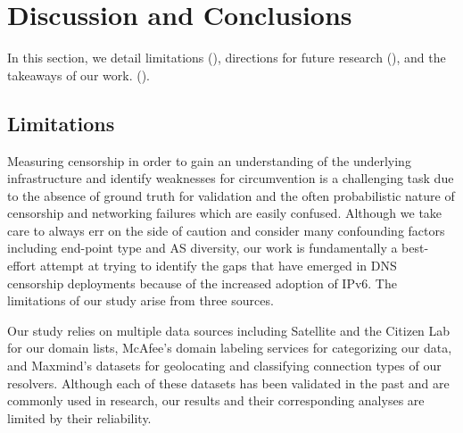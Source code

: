 \section{Discussion and Conclusions} \label{sec:discussion}

In this section, we detail limitations
(), directions for future research
(), and the takeaways of our work.
().

%

\subsection{Limitations}
\label{sec:discussion:limitations}
Measuring censorship in order to gain an understanding of the underlying
infrastructure and identify weaknesses for circumvention is a challenging task
due to the absence of ground truth for validation and the often probabilistic
nature of censorship and networking failures which are easily confused.
%
Although we take care to always err on the side of caution and consider many
confounding factors including end-point type and AS diversity, our work is
fundamentally a best-effort attempt at trying to identify the gaps that have
emerged in DNS censorship deployments because of the increased adoption of
IPv6. The limitations of our study arise from three sources.

Our study relies on multiple data sources including Satellite and the Citizen
Lab for our domain lists, McAfee's domain labeling services for categorizing
our data, and Maxmind's datasets for geolocating and classifying connection
types of our resolvers. Although each of these datasets has been validated in
the past and are commonly used in research, our results and their corresponding
analyses are limited by their reliability.

